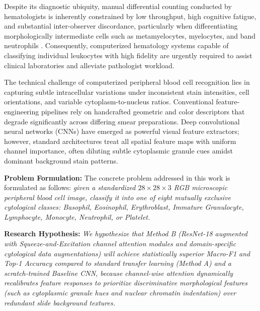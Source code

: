 \documentclass[conference]{IEEEtran}
\begin{document}
Despite its diagnostic ubiquity, manual differential counting conducted by hematologists is inherently constrained by low throughput, high cognitive fatigue, and substantial inter-observer discordance, particularly when differentiating morphologically intermediate cells such as metamyelocytes, myelocytes, and band neutrophils \cite{acevedo2020dataset, yang2023medmnist}. Consequently, computerized hematology systems capable of classifying individual leukocytes with high fidelity are urgently required to assist clinical laboratories and alleviate pathologist workload.

The technical challenge of computerized peripheral blood cell recognition lies in capturing subtle intracellular variations under inconsistent stain intensities, cell orientations, and variable cytoplasm-to-nucleus ratios. Conventional feature-engineering pipelines rely on handcrafted geometric and color descriptors that degrade significantly across differing smear preparations. Deep convolutional neural networks (CNNs) have emerged as powerful visual feature extractors; however, standard architectures treat all spatial feature maps with uniform channel importance, often diluting subtle cytoplasmic granule cues amidst dominant background stain patterns.

\textbf{Problem Formulation:} The concrete problem addressed in this work is formulated as follows: \textit{given a standardized $28 \times 28 \times 3$ RGB microscopic peripheral blood cell image, classify it into one of eight mutually exclusive cytological classes: Basophil, Eosinophil, Erythroblast, Immature Granulocyte, Lymphocyte, Monocyte, Neutrophil, or Platelet.}

\textbf{Research Hypothesis:} \textit{We hypothesize that Method B (ResNet-18 augmented with Squeeze-and-Excitation channel attention modules and domain-specific cytological data augmentations) will achieve statistically superior Macro-F1 and Top-1 Accuracy compared to standard transfer learning (Method A) and a scratch-trained Baseline CNN, because channel-wise attention dynamically recalibrates feature responses to prioritize discriminative morphological features (such as cytoplasmic granule hues and nuclear chromatin indentation) over redundant slide background textures.}
\end{document}

